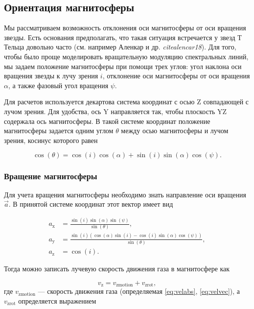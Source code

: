 \documentclass{article}
\begin{document}
\subsection{Ориентация магнитосферы}

Мы рассматриваем возможность отклонения оси магнитосферы от оси вращения звезды. Есть основания предполагать, что такая ситуация встречается у звезд Т Тельца довольно часто (см. например Аленкар и др. \textit{cite{alencar18}}). Для того, чтобы было проще моделировать вращательную модуляцию спектральных линий, мы задаем положение магнитосферы при помощи трех углов: угол наклона оси вращения звезды к лучу зрения $i$, отклонение оси магнитосферы от оси вращения $\alpha$, а также фазовый угол вращения $\psi$.

Для расчетов используется декартова система координат с осью Z совпадающей с лучом зрения. Для удобства, ось Y направляется так, чтобы плоскость YZ содержала ось магнитосферы. В такой системе координат положение магнитосферы задается одним углом $\theta$ между осью магнитосферы и лучом зрения, косинус которого равен

\begin{equation} \label{eq:costet}
\cos(\theta) = \cos(i)\cos(\alpha) + \sin(i)\sin(\alpha)\cos(\psi).
\end{equation}

\subsubsection{Вращение магнитосферы}

Для учета вращения магнитосферы необходимо знать направление оси вращения $\vec{a}$. В принятой системе координат этот вектор имеет вид

\begin{align} \label{eq:rotaxis}
a_\text{x} & = \frac{\sin(i)\sin(\alpha)\sin(\psi)}{\sin(\theta)}, \nonumber \\ 
a_\text{y} & = \frac{\sin(i)(\cos(\alpha)\sin(i) - \cos(i)\sin(\alpha)\cos(\psi))}{\sin(\theta)}, \nonumber \\ 
a_\text{z} & = \cos(i).
\end{align}

Тогда можно записать лучевую скорость движения газа в магнитосфере как

\begin{equation} \label{eq:vz}
v_\text{z} = v_\text{zmotion} + v_\text{zrot}, 
\end{equation}
где $v_\text{zmotion}$ --- скорость движения газа (определяемая \eqref{eq:velabs}, \eqref{eq:velvec}), а $v_\text{zrot}$ определяется выражением
\end{document}
